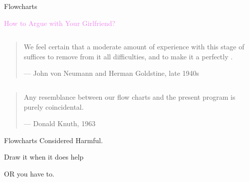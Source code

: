 \begin{frame}{}
  \centerline{\LARGE Flowcharts}

  \vspace{1.00cm}
  \centerline{\textcolor{violet}{How to Argue with Your Girlfriend?}}
\end{frame}

\begin{frame}{}
  \begin{columns}
  \end{columns}
  
  \vspace{0.50cm}
  \pause
  \begin{quote}
    We feel certain that a moderate amount of experience with this stage of 
    suffices to remove from it all difficulties,
    and to make it a perfectly .

    \hfill --- John von Neumann and Herman Goldstine, late 1940s
  \end{quote}
\end{frame}

\begin{frame}{}
  \begin{columns}
    \pause
  \end{columns}

  \vspace{0.40cm}
  \pause
  \begin{quote}
    Any resemblance between our flow charts and the present program is purely coincidental.

    \hfill --- Donald Knuth, 1963
  \end{quote}
\end{frame}

\begin{frame}{}

  \centerline{Flowcharts Considered Harmful.}
\end{frame}

\begin{frame}{}

  \vspace{0.50cm}
  \pause
  \centerline{\Large Draw it when it does help} 

  \vspace{0.20cm}
  \pause
  \centerline{\Large OR you have to.}
\end{frame}
